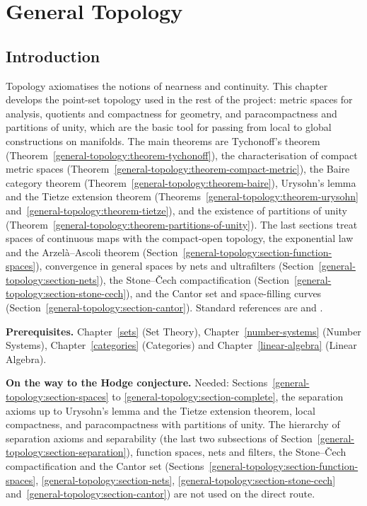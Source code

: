 \chapter{General Topology}\label{general-topology}

\section{Introduction}\label{general-topology:section-introduction}

Topology axiomatises the notions of nearness and continuity. This chapter develops the point-set topology used in
the rest of the project: metric spaces for analysis, quotients and compactness for geometry, and paracompactness and
partitions of unity, which are the basic tool for passing from local to global constructions on manifolds. The main
theorems are Tychonoff's theorem (Theorem~\ref{general-topology:theorem-tychonoff}), the characterisation of compact
metric spaces (Theorem~\ref{general-topology:theorem-compact-metric}), the Baire category theorem
(Theorem~\ref{general-topology:theorem-baire}), Urysohn's lemma and the Tietze extension theorem
(Theorems~\ref{general-topology:theorem-urysohn} and~\ref{general-topology:theorem-tietze}), and the existence of
partitions of unity (Theorem~\ref{general-topology:theorem-partitions-of-unity}). The last sections treat spaces of continuous maps with the compact-open topology, the exponential law and the Arzel\`a--Ascoli
theorem (Section~\ref{general-topology:section-function-spaces}), convergence in general spaces by nets and
ultrafilters (Section~\ref{general-topology:section-nets}), the Stone--\v{C}ech compactification (Section~\ref{general-topology:section-stone-cech}), and the Cantor set
and space-filling curves (Section~\ref{general-topology:section-cantor}). Standard references are
\cite{munkres-topology} and \cite{engelking-general-topology}.

\noindent\textbf{Prerequisites.} Chapter~\ref{sets} (Set Theory), Chapter~\ref{number-systems} (Number Systems),
Chapter~\ref{categories} (Categories) and Chapter~\ref{linear-algebra} (Linear Algebra).

\noindent\textbf{On the way to the Hodge conjecture.} Needed: Sections~\ref{general-topology:section-spaces} to \ref{general-topology:section-complete}, the separation axioms up to Urysohn's lemma and the Tietze extension theorem, local compactness, and
paracompactness with partitions of unity. The hierarchy of separation axioms and separability (the last two subsections of Section~\ref{general-topology:section-separation}), function spaces, nets and filters, the
Stone--\v{C}ech compactification and the Cantor set (Sections~\ref{general-topology:section-function-spaces}, \ref{general-topology:section-nets}, \ref{general-topology:section-stone-cech}
and~\ref{general-topology:section-cantor}) are not used on the direct route.

